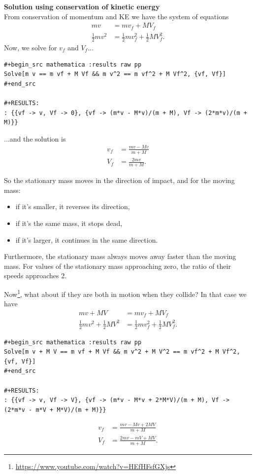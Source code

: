 {\bf Solution using conservation of kinetic energy}\\

From conservation of momentum and KE we have the system of equations
\begin{align}
  mv              &= mv_f + MV_f \\
  \frac{1}{2}mv^2 &= \frac{1}{2}mv_f^2 + \frac{1}{2}MV_f^2.
\end{align}
Now, we solve for $v_f$ and $V_f$...

\begin{verbatim}
#+begin_src mathematica :results raw pp
Solve[m v == m vf + M Vf && m v^2 == m vf^2 + M Vf^2, {vf, Vf}]
#+end_src

#+RESULTS:
: {{vf -> v, Vf -> 0}, {vf -> (m*v - M*v)/(m + M), Vf -> (2*m*v)/(m + M)}}
\end{verbatim}
...and the solution is
\begin{align*}
  v_f &= \frac{mv - Mv}{m + M} \\
  V_f &= \frac{2mv}{m + M}.
\end{align*}

So the stationary mass moves in the direction of impact, and for the moving mass:
\begin{itemize}
\item if it's smaller, it reverses its direction,
\item if it's the same mass, it stops dead,
\item if it's larger, it continues in the same direction.
\end{itemize}
Furthermore, the stationary mass always moves away faster than the moving mass. For values of the
stationary mass approaching zero, the ratio of their speeds approaches 2.


Now\footnote{\url{https://www.youtube.com/watch?v=HEfHFsfGXjs}}, what about if they are both in
motion when they collide? In that case we have
\begin{align}
  mv + MV                           &= mv_f + MV_f \\
  \frac{1}{2}mv^2 + \frac{1}{2}MV^2 &= \frac{1}{2}mv_f^2 + \frac{1}{2}MV_f^2.
\end{align}
\begin{verbatim}
#+begin_src mathematica :results raw pp
Solve[m v + M V == m vf + M Vf && m v^2 + M V^2 == m vf^2 + M Vf^2, {vf, Vf}]
#+end_src

#+RESULTS:
: {{vf -> v, Vf -> V}, {vf -> (m*v - M*v + 2*M*V)/(m + M), Vf -> (2*m*v - m*V + M*V)/(m + M)}}
\end{verbatim}
\begin{align*}
  v_f &= \frac{mv - Mv + 2MV}{m + M} \\
  V_f &= \frac{2mv - mV + MV}{m + M}.
\end{align*}

